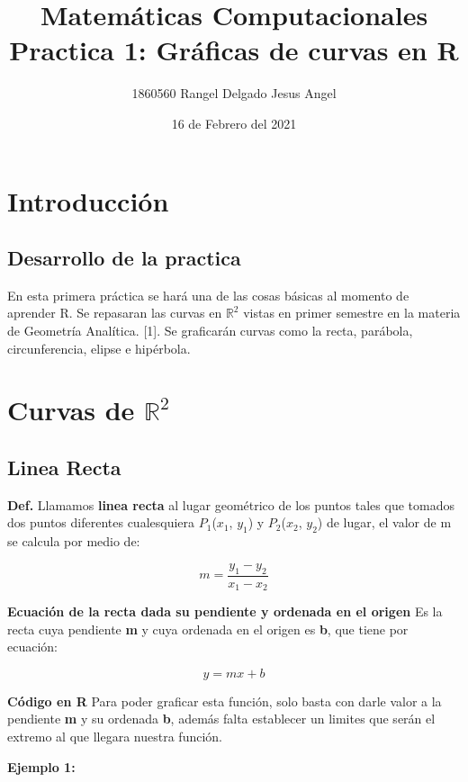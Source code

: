 \documentclass{article}
\title{Matemáticas Computacionales \\ Practica 1: Gráficas de curvas en R}
\author{1860560 Rangel Delgado Jesus Angel}
\date{16 de Febrero del 2021}
\begin{document}
\maketitle

\section{Introducción}
\subsection{Desarrollo de la practica}
En esta primera práctica se hará una de las cosas básicas al momento de aprender R. Se repasaran las curvas en $\mathbb{R}^2$
 vistas en primer semestre en la materia de Geometría Analítica. [1].
Se graficarán curvas como la recta, parábola, circunferencia, elipse e hipérbola.

\section{Curvas de $\mathbb{R}^2$}
\subsection{Linea Recta}
\textbf{Def.} Llamamos \textbf{linea recta} al lugar geométrico de los puntos tales que tomados dos puntos diferentes cualesquiera $P_1$($x_1$, $y_1$) y $P_2$($x_2$, $y_2$) de lugar, el valor de m se calcula por medio de:

\begin{equation}
    m = \frac{y_1-y_2}{x_1-x_2}
\end{equation}

\textbf{Ecuación de la recta dada su pendiente y ordenada en el origen} Es la recta cuya pendiente \textbf{m} y cuya ordenada en el origen es \textbf{b}, que tiene por ecuación:

\begin{equation}
    y = mx+b
\end{equation}

\textbf{Código en R}
\newline Para poder graficar esta función, solo basta con darle valor a la pendiente \textbf{m} y su ordenada \textbf{b}, además falta establecer un limites que serán el extremo al que llegara nuestra función.

\newpage

\textbf{Ejemplo 1:}
\end{document}

